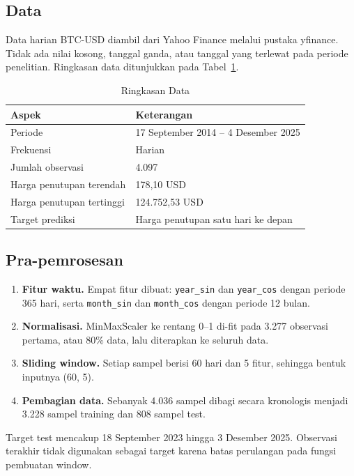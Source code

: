 \documentclass[conference,a4paper]{IEEEtran}
\begin{document}
\subsection{Data}
Data harian BTC-USD diambil dari Yahoo Finance melalui pustaka yfinance. Tidak ada nilai kosong, tanggal ganda, atau tanggal yang terlewat pada periode penelitian. Ringkasan data ditunjukkan pada Tabel~\ref{tab:data}.

\begin{table}[!t]
\centering
\caption{Ringkasan Data}
\label{tab:data}
\footnotesize
\begin{tabular}{@{}ll@{}}
\toprule
\textbf{Aspek} & \textbf{Keterangan} \\
\midrule
Periode & 17 September 2014 -- 4 Desember 2025 \\
Frekuensi & Harian \\
Jumlah observasi & 4.097 \\
Harga penutupan terendah & 178,10 USD \\
Harga penutupan tertinggi & 124.752,53 USD \\
Target prediksi & Harga penutupan satu hari ke depan \\
\bottomrule
\end{tabular}
\end{table}

\subsection{Pra-pemrosesan}
\begin{enumerate}
\item \textbf{Fitur waktu.} Empat fitur dibuat: \texttt{year\_sin} dan \texttt{year\_cos} dengan periode 365 hari, serta \texttt{month\_sin} dan \texttt{month\_cos} dengan periode 12 bulan.
\item \textbf{Normalisasi.} MinMaxScaler ke rentang 0--1 di-fit pada 3.277 observasi pertama, atau 80\% data, lalu diterapkan ke seluruh data.
\item \textbf{Sliding window.} Setiap sampel berisi 60 hari dan 5 fitur, sehingga bentuk inputnya (60, 5).
\item \textbf{Pembagian data.} Sebanyak 4.036 sampel dibagi secara kronologis menjadi 3.228 sampel training dan 808 sampel test.
\end{enumerate}

Target test mencakup 18 September 2023 hingga 3 Desember 2025. Observasi terakhir tidak digunakan sebagai target karena batas perulangan pada fungsi pembuatan window.
\end{document}
